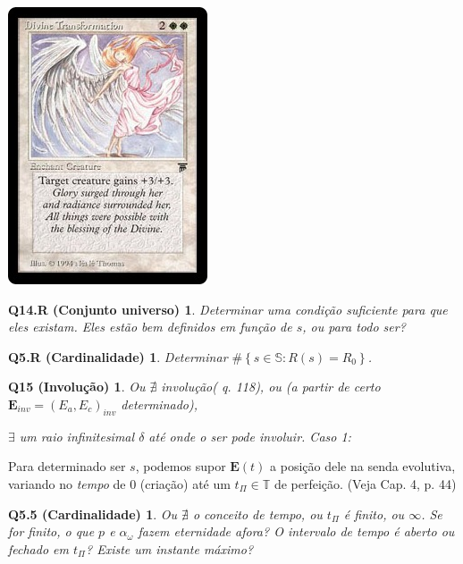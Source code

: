 \documentclass[12pt,a4paper]{article}
\begin{document}
			\begin{center}
			\includegraphics{transformation}
			\end{center}

			\newtheorem{Q14.R}{Q14.R (Conjunto universo)}
			\begin{Q14.R} Determinar uma condi\c{c}\~ao suficiente para que eles existam. Eles est\~ao bem definidos em fun\c{c}\~ao de $s$, ou para todo ser?
			\end{Q14.R}

			\newtheorem{Q5.R}{Q5.R (Cardinalidade)}
			\begin{Q5.R} Determinar $ \#\left\{s \in \mathbb{S} : R(s) = R_0 \right\}$.
			\end{Q5.R}

			\newtheorem{Q15}{Q15 (Involu\c{c}\~ao)}\label{involution}
			\begin{Q15}
				Ou $ \nexists $ involu\c{c}\~ao\footnotemark[1] (\cite{le} q. 118), ou (a partir de certo $ \mathbf{E}_{inv} = (E_a, E_c)_{inv}$ determinado),

				$ \exists $ um raio infinitesimal $ \delta $ at\'e onde o ser pode involuir. Caso 1:
			\end{Q15}


			Para determinado ser $s$, podemos supor $ \mathbf{E}(t) $  a posi\c{c}\~ao dele na senda evolutiva, variando no \emph{tempo} de 0 (cria\c{c}\~ao) at\'e um $ t_\Pi \in \mathbb{T} $ de perfei\c{c}\~ao. (Veja \cite{brennan} Cap. 4, p. 44)

			\newtheorem{Q5.5}{Q5.5 (Cardinalidade)}
			\begin{Q5.5} Ou $ \nexists $ o conceito de tempo, ou $ t_\Pi $ \'e finito, ou $ \infty $\footnotemark[2]. Se for finito, o que $p$ e $ \alpha_\omega $ fazem eternidade afora? O intervalo de tempo \'e aberto ou fechado em $ t_\Pi $? Existe um instante m\'aximo?
			\end{Q5.5}
\end{document}
